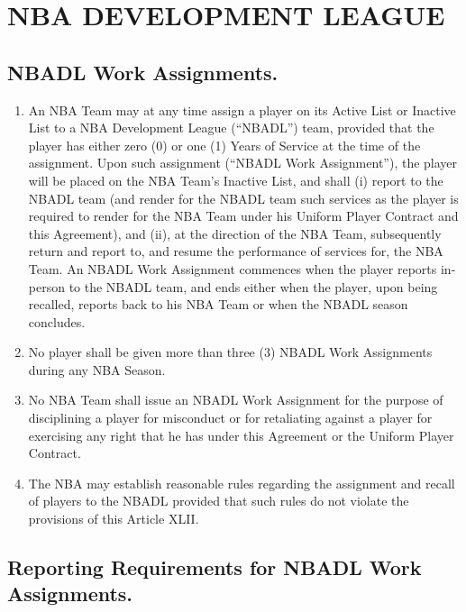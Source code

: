 \documentclass[
]{book}
\providecommand{\tightlist}{%
  \setlength{\itemsep}{0pt}\setlength{\parskip}{0pt}}
\begin{document}
\hypertarget{nba-development-league}{%
\chapter{NBA DEVELOPMENT LEAGUE}\label{nba-development-league}}

\hypertarget{nbadl-work-assignments.}{%
\section{NBADL Work Assignments.}\label{nbadl-work-assignments.}}

\begin{enumerate}
\def\labelenumi{(\alph{enumi})}
\tightlist
\item
  An NBA Team may at any time assign a player on its Active List or Inactive List to a NBA Development League (``NBADL'') team, provided that the player has either zero (0) or one (1) Years of Service at the time of the assignment. Upon such assignment (``NBADL Work Assignment''), the player will be placed on the NBA Team's Inactive List, and shall (i) report to the NBADL team (and render for the NBADL team such services as the player is required to render for the NBA Team under his Uniform Player Contract and this Agreement), and (ii), at the direction of the NBA Team, subsequently return and report to, and resume the performance of services for, the NBA Team. An NBADL Work Assignment commences when the player reports in-person to the NBADL team, and ends either when the player, upon being recalled, reports back to his NBA Team or when the NBADL season concludes.
\item
  No player shall be given more than three (3) NBADL Work Assignments during any NBA Season.
\item
  No NBA Team shall issue an NBADL Work Assignment for the purpose of disciplining a player for misconduct or for retaliating against a player for exercising any right that he has under this Agreement or the Uniform Player Contract.
\item
  The NBA may establish reasonable rules regarding the assignment and recall of players to the NBADL provided that such rules do not violate the provisions of this Article XLII.
\end{enumerate}

\hypertarget{reporting-requirements-for-nbadl-work-assignments.}{%
\section{Reporting Requirements for NBADL Work Assignments.}\label{reporting-requirements-for-nbadl-work-assignments.}}
\end{document}
